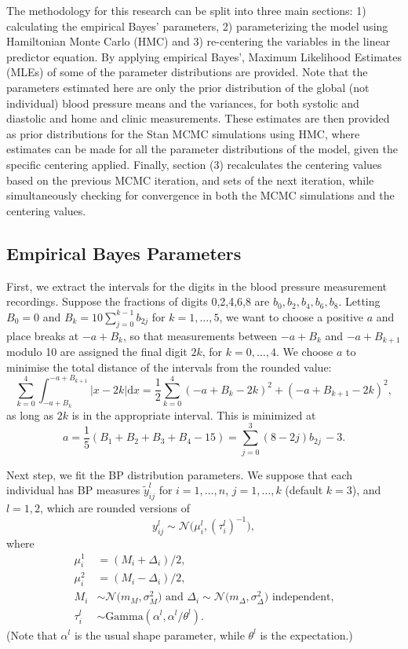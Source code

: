 \documentclass[
]{article}
\begin{document}
The methodology for this research can be split into three main sections: 1) calculating the empirical Bayes' parameters, 2) parameterizing the model using Hamiltonian Monte Carlo (HMC) and 3) re-centering the variables in the linear predictor equation. By applying empirical Bayes', Maximum Likelihood Estimates (MLEs) of some of the parameter distributions are provided. Note that the parameters estimated here are only the prior distribution of the global (not individual) blood pressure means and the variances, for both systolic and diastolic and home and clinic measurements. These estimates are then provided as prior distributions for the Stan MCMC simulations using HMC, where estimates can be made for all the parameter distributions of the model, given the specific centering applied. Finally, section (3) recalculates the centering values based on the previous MCMC iteration, and sets of the next iteration, while simultaneously checking for convergence in both the MCMC simulations and the centering values.

\hypertarget{empirical-bayes-parameters}{%
\subsection{Empirical Bayes Parameters}\label{empirical-bayes-parameters}}

First, we extract the intervals for the digits in the blood pressure measurement recordings. Suppose the fractions of digits 0,2,4,6,8 are \(b_0,b_2,b_4,b_6,b_8\).
Letting \(B_0=0\) and \(B_k=10\sum_{j=0}^{k-1}b_{2j}\) for \(k=1,\dots,5\),
we want to choose a positive \(a\) and place breaks at \(-a+B_k\), so that measurements between \(-a+B_k\) and \(-a+B_{k+1}\) modulo
10 are assigned the final digit \(2k\), for \(k=0,\dots,4\).
We choose \(a\) to minimise the total distance of the intervals from the rounded value:
\[
  \sum_{k=0}^4 \int_{-a+B_k}^{-a+B_{k+1}} \bigl| x-2k\bigr|\mathrm{d} x=\frac12\sum_{k=0}^4 \left(-a+B_k-2k\right)^2 + \left(-a+B_{k+1}-2k\right)^2,
\]
as long as \(2k\) is in the appropriate interval. This is minimized at
\[
  a= \frac{1}{5}\left(B_1+B_2+B_3+B_4 - 15\right)=\sum_{j=0}^3 (8-2j) b_{2j} \, - 3.
\]

Next step, we fit the BP distribution parameters. We suppose that each individual has BP measures
\(\tilde{y}_{ij}^l\) for \(i=1,\dots,n\), \(j=1,\dots,k\) (default \(k=3\)),
and \(l=1,2\), which are rounded versions of
\[
  y_{ij}^l \sim \mathcal{N}\bigl( \mu_i^l,(\tau_i^l)^{-1}\bigr),
\]
where
\begin{align*}
\mu_i^1&=(M_i+\Delta_i)/2,\\
\mu_i^2&=(M_i-\Delta_i)/2,\\
M_i&\sim \mathcal{N}\bigl(m_M,\sigma^2_M) \text{ and }
  \Delta_i\sim \mathcal{N}\bigl(m_\Delta,\sigma^2_\Delta) \text{ independent,}\\
  \tau_i^l &\sim \mathrm{Gamma}(\alpha^l,\alpha^l/\theta^l ).
\end{align*}
(Note that \(\alpha^l\) is the usual shape parameter,
while \(\theta^l\) is the expectation.)
\end{document}
